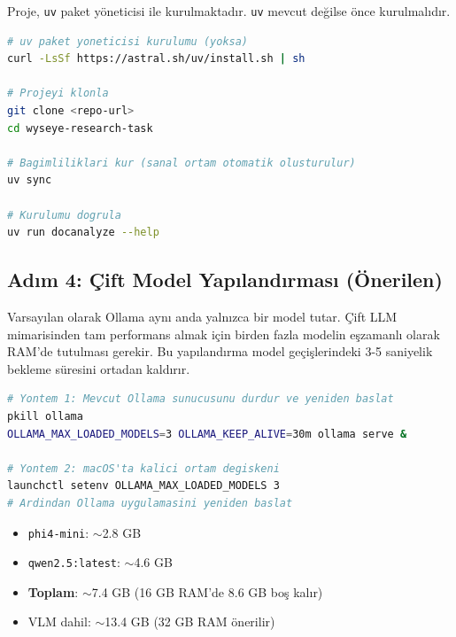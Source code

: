 \documentclass[11pt,a4paper]{article}
\begin{document}
Proje, \texttt{uv} paket yöneticisi ile kurulmaktadır. \texttt{uv} mevcut değilse önce kurulmalıdır.

\begin{lstlisting}[language=bash, basicstyle=\ttfamily\small, frame=single, breaklines=true, caption={Proje Kurulumu}]
# uv paket yoneticisi kurulumu (yoksa)
curl -LsSf https://astral.sh/uv/install.sh | sh

# Projeyi klonla
git clone <repo-url>
cd wyseye-research-task

# Bagimliliklari kur (sanal ortam otomatik olusturulur)
uv sync

# Kurulumu dogrula
uv run docanalyze --help
\end{lstlisting}

\subsection{Adım 4: Çift Model Yapılandırması (Önerilen)}

Varsayılan olarak Ollama aynı anda yalnızca bir model tutar. Çift LLM mimarisinden tam performans almak için birden fazla modelin eşzamanlı olarak RAM'de tutulması gerekir. Bu yapılandırma model geçişlerindeki 3-5 saniyelik bekleme süresini ortadan kaldırır.

\begin{lstlisting}[language=bash, basicstyle=\ttfamily\small, frame=single, breaklines=true, caption={Çift Model Yapılandırması}]
# Yontem 1: Mevcut Ollama sunucusunu durdur ve yeniden baslat
pkill ollama
OLLAMA_MAX_LOADED_MODELS=3 OLLAMA_KEEP_ALIVE=30m ollama serve &

# Yontem 2: macOS'ta kalici ortam degiskeni
launchctl setenv OLLAMA_MAX_LOADED_MODELS 3
# Ardindan Ollama uygulamasini yeniden baslat
\end{lstlisting}

\begin{tcolorbox}[colback=blue!5, colframe=blue!60, title=RAM Bütçesi Hesaplaması]
\begin{itemize}[noitemsep]
\item \texttt{phi4-mini}: $\sim$2.8 GB
\item \texttt{qwen2.5:latest}: $\sim$4.6 GB
\item \textbf{Toplam}: $\sim$7.4 GB (16 GB RAM'de 8.6 GB boş kalır)
\item VLM dahil: $\sim$13.4 GB (32 GB RAM önerilir)
\end{itemize}
\end{tcolorbox}
\end{document}
